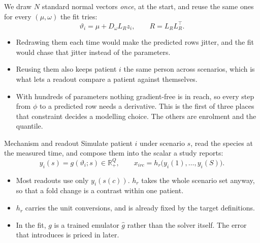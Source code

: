 \documentclass[10pt,aspectratio=169]{beamer}
\newcommand{\Tr}{^{\!\top}}
\begin{document}
\begin{frame}[t]
  We draw $N$ standard normal vectors \emph{once}, at the start, and reuse the
  same ones for every $(\mu,\omega)$ the fit tries:
  \[ \vartheta_i = \mu + D_\omega L_R z_i, \qquad R = L_R L_R\Tr . \]
  \begin{itemize}\setlength\itemsep{8pt}
    \item Redrawing them each time would make the predicted rows jitter, and the
      fit would chase that jitter instead of the parameters.
    \item Reusing them also keeps patient $i$ the same person across scenarios,
      which is what lets a readout compare a patient against themselves.
    \item With hundreds of parameters nothing gradient-free is in reach, so
      every step from $\phi$ to a predicted row needs a derivative. This is the
      first of three places that constraint decides a modelling choice. The
      others are enrolment and the quantile.
  \end{itemize}
\end{frame}

\begin{frame}[t]{Mechanism and readout}
  Simulate patient $i$ under scenario $s$, read the species at the measured
  time, and compose them into the scalar a study reports:
  \[
    y_i(s) = g(\vartheta_i;s) \in \mathbb{R}^Q_+ ,
    \qquad
    x_{irc} = h_r\big(y_i(1),\dots,y_i(S)\big).
  \]
  \begin{itemize}
    \item Most readouts use only $y_i(s(c))$. $h_r$ takes the whole scenario set
      anyway, so that a fold change is a contrast within one patient.
    \item $h_r$ carries the unit conversions, and is already fixed by the target
      definitions.
    \item In the fit, $g$ is a trained emulator $\widehat g$ rather than the
      solver itself. The error that introduces is priced in later.
  \end{itemize}
\end{frame}
\end{document}

